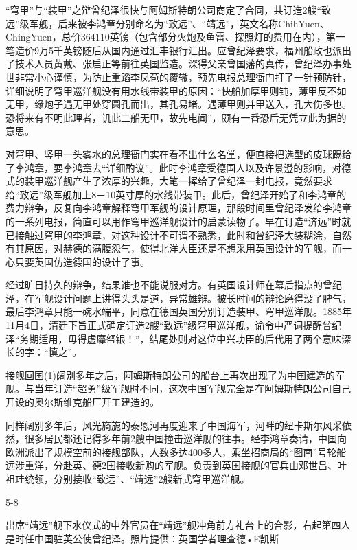 \documentclass[12pt,UTF8]{ctexbook}
\begin{document}
“穹甲”与“装甲”之辩曾纪泽很快与阿姆斯特朗公司商定了合同，共订造2艘“致远”级军舰，后来被李鸿章分别命名为“致远”、“靖远”，英文名称ChihYuen、ChingYuen，总价364110英镑（包含部分火炮及鱼雷、探照灯的费用在内），第一笔造价9万5千英镑随后从国内通过汇丰银行汇出。应曾纪泽要求，福州船政也派出了技术人员黄戴、张启正等前往英国监造。深得父亲曾国藩的真传，曾纪泽办事处世非常小心谨慎，为防止重蹈李凤苞的覆辙，预先电报总理衙门打了一针预防针，详细说明了穹甲巡洋舰没有用水线带装甲的原因：“快船加厚甲则钝，薄甲反不如无甲，缘炮子遇无甲处穿圆孔而出，其孔易堵。遇薄甲则并甲送入，孔大伤多也。恐将来有不明此理者，讥此二船无甲，故先电闻”，颇有一番恐后无凭立此为据的意思。

对穹甲、竖甲一头雾水的总理衙门实在看不出什么名堂，便直接把选型的皮球踢给了李鸿章，要李鸿章去“详细酌议”。此时李鸿章受德国人以及许景澄的影响，对德式的装甲巡洋舰产生了浓厚的兴趣，大笔一挥给了曾纪泽一封电报，竟然要求给“致远”级军舰加上8－10英寸厚的水线带装甲。此后，曾纪泽开始了和李鸿章的费力辩争，反复向李鸿章解释穹甲军舰的设计原理，那段时间里曾纪泽发给李鸿章的一系列电报，简直可以用作穹甲巡洋舰设计的启蒙读物了。早在订造“济远”时就已接触过穹甲的李鸿章，对这种设计不可谓不熟悉，此时和曾纪泽大装糊涂，自然有其原因，对赫德的满腹怨气，使得北洋大臣还是不想采用英国设计的军舰，而一心只要英国仿造德国的设计了事。

经过旷日持久的辩争，结果谁也不能说服对方。有英国设计师在幕后指点的曾纪泽，在军舰设计问题上讲得头头是道，异常雄辩。被长时间的辩论磨得没了脾气，最后李鸿章只能一碗水端平，同意在德国英国分别订造装甲、穹甲巡洋舰。1885年11月4日，清廷下旨正式确定订造2艘“致远”级穹甲巡洋舰，谕令中严词提醒曾纪泽“务期适用，毋得虚靡帑银！”，结尾处则对这位中兴功臣的后代用了两个意味深长的字：“慎之”。

接舰回国(1)阔别多年之后，阿姆斯特朗公司的船台上再次出现了为中国建造的军舰。与当年订造“超勇”级军舰时不同，这次中国军舰完全是在阿姆斯特朗公司自己开设的奥尔斯维克船厂开工建造的。

同样阔别多年后，风光旖旎的泰恩河再度迎来了中国海军，河畔的纽卡斯尔风采依然，很多居民都还记得多年前2艘中国撞击巡洋舰的往事。经李鸿章奏请，中国向欧洲派出了规模空前的接舰部队，人数多达400多人，乘坐招商局的“图南”号轮船远涉重洋，分赴英、德2国接收新购的军舰。负责到英国接舰的官兵由邓世昌、叶祖珪统领，分别接收“致远”、“靖远”2艘新式穹甲巡洋舰。

5-8

出席“靖远”舰下水仪式的中外官员在“靖远”舰冲角前方礼台上的合影，右起第四人是时任中国驻英公使曾纪泽。照片提供：英国学者理查德•E凯斯
\end{document}
